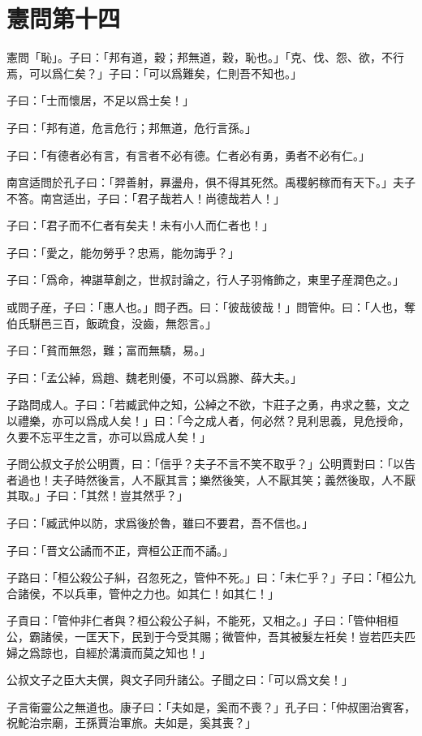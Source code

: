 \section[憲問第十四]{憲問第十四}

憲問「恥」。子曰：「邦有道，穀；邦無道，穀，恥也。」「克、伐、怨、欲，不行焉，可以爲仁矣？」子曰：「可以爲難矣，仁則吾不知也。」

子曰：「士而懷居，不足以爲士矣！」

子曰：「邦有道，危言危行；邦無道，危行言孫。」

子曰：「有德者必有言，有言者不必有德。仁者必有勇，勇者不必有仁。」

南宫适問於孔子曰：「羿善射，奡盪舟，俱不得其死然。禹稷躬稼而有天下。」夫子不答。南宫适出，子曰：「君子哉若人！尚德哉若人！」

子曰：「君子而不仁者有矣夫！未有小人而仁者也！」

子曰：「愛之，能勿勞乎？忠焉，能勿誨乎？」

子曰：「爲命，裨諶草創之，世叔討論之，行人子羽脩飾之，東里子産潤色之。」

或問子産，子曰：「惠人也。」問子西。曰：「彼哉彼哉！」問管仲。曰：「人也，奪伯氏駢邑三百，飯疏食，没齒，無怨言。」

子曰：「貧而無怨，難；富而無驕，易。」

子曰：「孟公綽，爲趙、魏老則優，不可以爲滕、薛大夫。」

子路問成人。子曰：「若臧武仲之知，公綽之不欲，卞莊子之勇，冉求之藝，文之以禮樂，亦可以爲成人矣！」曰：「今之成人者，何必然？見利思義，見危授命，久要不忘平生之言，亦可以爲成人矣！」

子問公叔文子於公明賈，曰：「信乎？夫子不言不笑不取乎？」公明賈對曰：「以告者過也！夫子時然後言，人不厭其言；樂然後笑，人不厭其笑；義然後取，人不厭其取。」子曰：「其然！豈其然乎？」

子曰：「臧武仲以防，求爲後於魯，雖曰不要君，吾不信也。」

子曰：「晋文公譎而不正，齊桓公正而不譎。」

子路曰：「桓公殺公子糾，召忽死之，管仲不死。」曰：「未仁乎？」子曰：「桓公九合諸侯，不以兵車，管仲之力也。如其仁！如其仁！」

子貢曰：「管仲非仁者與？桓公殺公子糾，不能死，又相之。」子曰：「管仲相桓公，霸諸侯，一匡天下，民到于今受其賜；微管仲，吾其被髮左衽矣！豈若匹夫匹婦之爲諒也，自經於溝瀆而莫之知也！」

公叔文子之臣大夫僎，與文子同升諸公。子聞之曰：「可以爲文矣！」

子言衞靈公之無道也。康子曰：「夫如是，奚而不喪？」孔子曰：「仲叔圉治賓客，祝鮀治宗廟，王孫賈治軍旅。夫如是，奚其喪？」

